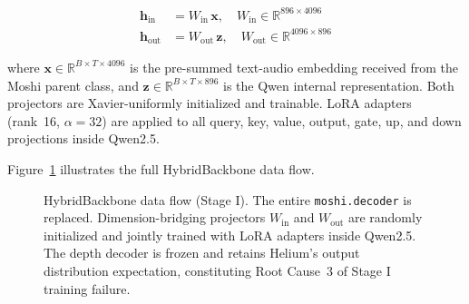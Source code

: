 \documentclass[conference]{IEEEtran}
\begin{document}
\begin{align}
  \mathbf{h}_{\text{in}}  &= W_{\text{in}}\,\mathbf{x},
    \quad W_{\text{in}}  \in \mathbb{R}^{896 \times 4096} \label{eq:win} \\
  \mathbf{h}_{\text{out}} &= W_{\text{out}}\,\mathbf{z},
    \quad W_{\text{out}} \in \mathbb{R}^{4096 \times 896} \label{eq:wout}
\end{align}

where $\mathbf{x} \in \mathbb{R}^{B \times T \times 4096}$ is the pre-summed
text-audio embedding received from the Moshi parent class, and
$\mathbf{z} \in \mathbb{R}^{B \times T \times 896}$ is the Qwen internal
representation.
Both projectors are Xavier-uniformly initialized and trainable.
LoRA adapters (rank~16, $\alpha=32$) are applied to all query, key, value,
output, gate, up, and down projections inside Qwen2.5.

Figure~\ref{fig:hybrid_arch} illustrates the full HybridBackbone data flow.

\begin{figure}[t]
\centering
{}
\caption{HybridBackbone data flow (Stage I). The entire \texttt{moshi.decoder}
is replaced. Dimension-bridging projectors $W_{\text{in}}$ and $W_{\text{out}}$
are randomly initialized and jointly trained with LoRA adapters inside Qwen2.5.
The depth decoder is frozen and retains Helium's output distribution expectation,
constituting Root Cause~3 of Stage I training failure.}
\label{fig:hybrid_arch}
\end{figure}
\end{document}
